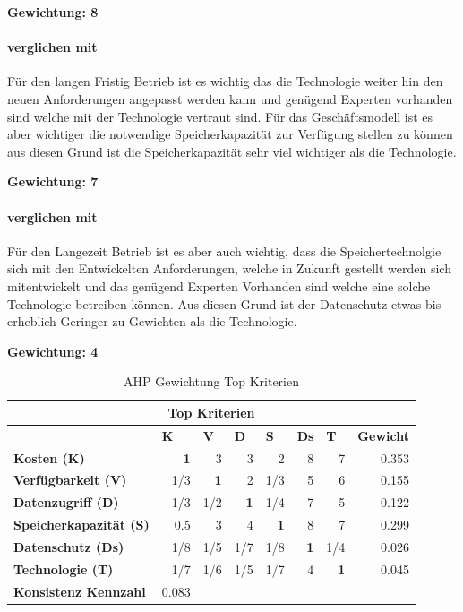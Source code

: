 \textbf{Gewichtung: 8}

\paragraph*{ verglichen mit }
Für den langen Fristig Betrieb ist es wichtig das die Technologie weiter hin den neuen Anforderungen angepasst werden kann und genügend Experten vorhanden sind welche mit der Technologie vertraut sind. Für das Geschäftsmodell ist es aber wichtiger die notwendige Speicherkapazität zur Verfügung stellen zu können aus diesen Grund ist die Speicherkapazität sehr viel wichtiger als die Technologie.

\textbf{Gewichtung: 7}

\paragraph*{ verglichen mit }
Für den Langezeit Betrieb ist es aber auch wichtig, dass die Speichertechnolgie sich mit den Entwickelten Anforderungen, welche in Zukunft gestellt werden sich mitentwickelt und das genügend Experten Vorhanden sind welche eine solche Technologie betreiben können. Aus diesen Grund ist der Datenschutz etwas bis erheblich Geringer zu Gewichten als  die Technologie.

\textbf{Gewichtung: 4}

\begin{table}[htbp]
\caption{AHP Gewichtung Top Kriterien}
\begin{tabular}{|l|r|r|r|r|r|r|r|}
\hline
\multicolumn{ 8}{|c|}{\textbf{Top Kriterien}} \\ \hline
 & \multicolumn{1}{l|}{\textbf{K}} & \multicolumn{1}{l|}{\textbf{V}} & \multicolumn{1}{l|}{\textbf{D}} & \multicolumn{1}{l|}{\textbf{S}} & \multicolumn{1}{l|}{\textbf{Ds}} & \multicolumn{1}{l|}{\textbf{T}} & \multicolumn{1}{l|}{\textbf{Gewicht}} \\ \hline
\textbf{Kosten (K)} & \textbf{1} & 3 & 3 & 2 & 8 & 7 & 0.353 \\ \hline
\textbf{Verfügbarkeit (V)} &  1/3 & \textbf{1} & 2 &  1/3 & 5 & 6 & 0.155 \\ \hline
\textbf{Datenzugriff (D)} &  1/3 &  1/2 & \textbf{1} &  1/4 & 7 & 5 & 0.122 \\ \hline
\textbf{Speicherkapazität (S)} & 0.5 & 3 & 4 & \textbf{1} & 8 & 7 & 0.299 \\ \hline
\textbf{Datenschutz (Ds)} &  1/8 &  1/5 &  1/7 &  1/8 & \textbf{1} &  1/4 & 0.026 \\ \hline
\textbf{Technologie (T)} &  1/7 &  1/6 &  1/5 &  1/7 & 4 & \textbf{1} & 0.045 \\ \hline
\textbf{Konsistenz Kennzahl} & 0.083  \\ \cline{1-2}
\end{tabular}
\label{AHPTop}
\end{table}

